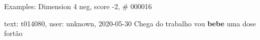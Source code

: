 \begin{frame}{Examples: Dimension 4 neg, score -2, \# 000016}
\footnotesize
\begin{alertblock}{text: t014080, user: unknown, 2020-05-30}
Chega do trabalho vou \textbf{bebe} uma dose fortão  
\textbf{} 
\end{alertblock}
\end{frame}

